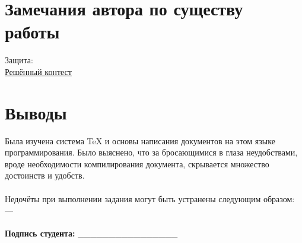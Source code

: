 \documentclass{article}
\begin{document}
\section{Замечания автора по существу работы}
Защита: \\
    \href{https://codeforces.com/submissions/SempaiTakoo/contest/1807}{Решённый контест}

\section{Выводы}
Была изучена система TeX и основы написания документов на этом языке программирования. Было выяснено, что за бросающимися в глаза неудобствами, вроде необходимости компилирования документа, скрывается множество достоинств и удобств. \\\\
Недочёты при выполнении задания могут быть устранены следующим образом: — \\\\
\textbf{Подпись студента:} ________________
\end{document}
